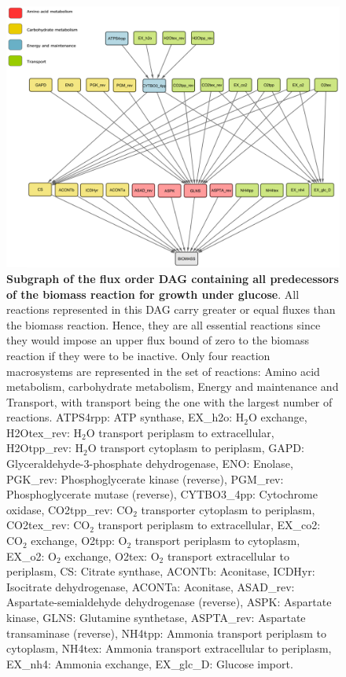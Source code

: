 \documentclass[12pt]{article}
\begin{document}
\begin{figure}
  \centering
  \includegraphics[width=\textwidth]{Fig4.png}
  \caption{\small \textbf{Subgraph of the flux order DAG containing all predecessors of the biomass reaction for growth under glucose}. All reactions represented in this DAG carry greater or equal fluxes than the biomass reaction. Hence, they are all essential reactions since they would impose an upper flux bound of zero to the biomass reaction if they were to be inactive. Only four reaction macrosystems are represented in the set of reactions: Amino acid metabolism, carbohydrate metabolism, Energy and maintenance and Transport, with transport being the one with the largest number of reactions. ATPS4rpp: ATP synthase, EX\_h2o: $\mathrm{H}_2\mathrm{O}$ exchange, H2Otex\_rev: $\mathrm{H}_2\mathrm{O}$ transport periplasm to extracellular, H2Otpp\_rev: $\mathrm{H}_2\mathrm{O}$ transport cytoplasm to periplasm, GAPD: Glyceraldehyde-3-phosphate dehydrogenase, ENO: Enolase, PGK\_rev: Phosphoglycerate kinase (reverse), PGM\_rev: Phosphoglycerate mutase (reverse), CYTBO3\_4pp: Cytochrome oxidase, CO2tpp\_rev: $\mathrm{CO}_2$ transporter cytoplasm to periplasm, CO2tex\_rev: $\mathrm{CO}_2$ transport periplasm to extracellular, EX\_co2: $\mathrm{CO}_2$ exchange, O2tpp: $\mathrm{O}_2$ transport periplasm to cytoplasm, EX\_o2: $\mathrm{O}_2$ exchange, O2tex: $\mathrm{O}_2$ transport extracellular to periplasm, CS: Citrate synthase, ACONTb: Aconitase, ICDHyr: Isocitrate dehydrogenase, ACONTa: Aconitase, ASAD\_rev: Aspartate-semialdehyde dehydrogenase (reverse), ASPK: Aspartate kinase, GLNS: Glutamine synthetase, ASPTA\_rev: Aspartate transaminase (reverse), NH4tpp: Ammonia transport periplasm to cytoplasm, NH4tex: Ammonia transport extracellular to periplasm, EX\_nh4: Ammonia exchange, EX\_glc\_D: Glucose import.}
  \label{fig:biomassDAG}
\end{figure}
\end{document}

